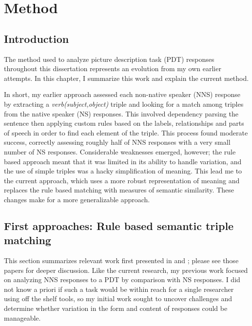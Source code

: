 \chapter{Method}
\label{chap:method}
%
%
%
%
%
%
%
%
%
%
%
%
\section{Introduction}
The method used to analyze picture description task (PDT) responses throughout this dissertation represents an evolution from my own earlier attempts. In this chapter, I summarize this work and explain the current method.

In short, my earlier approach assessed each non-native speaker (NNS) response by extracting a \textit{verb(subject,object)} triple and looking for a match among triples from the native speaker (NS) responses. This involved dependency parsing the sentence then applying custom rules based on the labels, relationships and parts of speech in order to find each element of the triple. This process found moderate success, correctly assessing roughly half of NNS responses with a very small number of NS responses. Considerable weaknesses emerged, however; the rule based approach meant that it was limited in its ability to handle variation, and the use of simple triples was a hacky simplification of meaning. This lead me to the current approach, which uses a more robust representation of meaning and replaces the rule based matching with measures of semantic similarity. These changes make for a more generalizable approach.

\section{First approaches: Rule based semantic triple matching}
\label{sec:first-approaches}
This section summarizes relevant work first presented in \citet{king:dickinson:13} and \citet{king:dickinson:14}; please see those papers for deeper discussion. Like the current research, my previous work focused on analyzing NNS responses to a PDT by comparison with NS responses. I did not know a priori if such a task would be within reach for a single researcher using off the shelf tools, so my initial work sought to uncover challenges and determine whether variation in the form and content of responses could be manageable.

